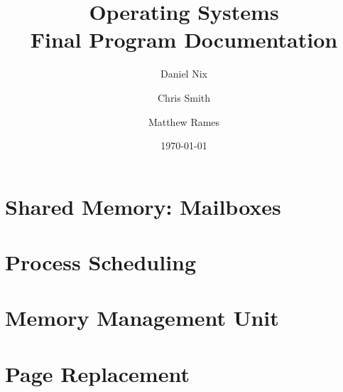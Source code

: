 \documentclass{book}
\title{\huge \bfseries Operating Systems\\ Final Program Documentation }
\author{  Daniel Nix \and  Chris Smith \and  Matthew Rames }
\date{\today}
\begin{document}
\maketitle

\tableofcontents

\chapter{Shared Memory: Mailboxes}


\chapter{Process Scheduling}



\chapter{Memory Management Unit}


\chapter{Page Replacement}

\end{document}
